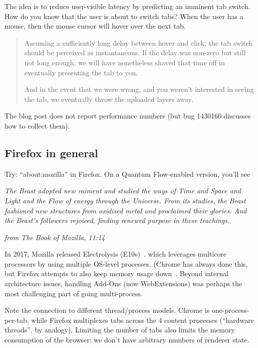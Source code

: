 \documentclass[a4paper]{report}
\begin{document}
The idea is to reduce user-visible latency by predicting an imminent tab switch. How do you know that the user is about to switch tabs? When the user has a mouse, then the mouse cursor will hover over the next tab.

\begin{quote}
Assuming a sufficiently long delay between hover and click, the tab switch should be perceived as instantaneous. If the delay was non-zero but still not long enough, we will have nonetheless shaved that time off in eventually presenting the tab to you.

And in the event that we were wrong, and you weren’t interested in seeing the tab, we eventually throw the uploaded layers away.
\end{quote}

The blog post does not report performance numbers (but bug 1430160 discusses how to collect them).

\subsection*{Firefox in general}

Try: ``about:mozilla'' in Firefox. On a Quantum Flow-enabled version, you'll see

\begin{center}
\emph{The Beast adopted new raiment and studied the ways of Time and Space and Light and the Flow of energy through the Universe. From its studies, the Beast fashioned new structures from oxidised metal and proclaimed their glories. And the Beast’s followers rejoiced, finding renewed purpose in these teachings.}

\hfill \emph{from The Book of Mozilla, 11:14}
\end{center}

In 2017, Mozilla released Electrolysis (E10s)~\cite{electrolysis}.
which leverages multicore processors by using multiple OS-level
processes. (Chrome has always done this, but Firefox attempts to also
keep memory usage
down~\cite{goldilocks}.
Beyond internal architecture issues, handling Add-Ons (now
WebExtensions) was perhaps the most challenging part of going
multi-process.

Note the connection to different thread/process models.
Chrome is one-process-per-tab, while Firefox multiplexes tabs across
the 4 content processes (``hardware threads'', by analogy). Limiting
the number of tabs also limits the memory consumption of the browser:
we don't have arbitrary numbers of renderer state.
\end{document}
